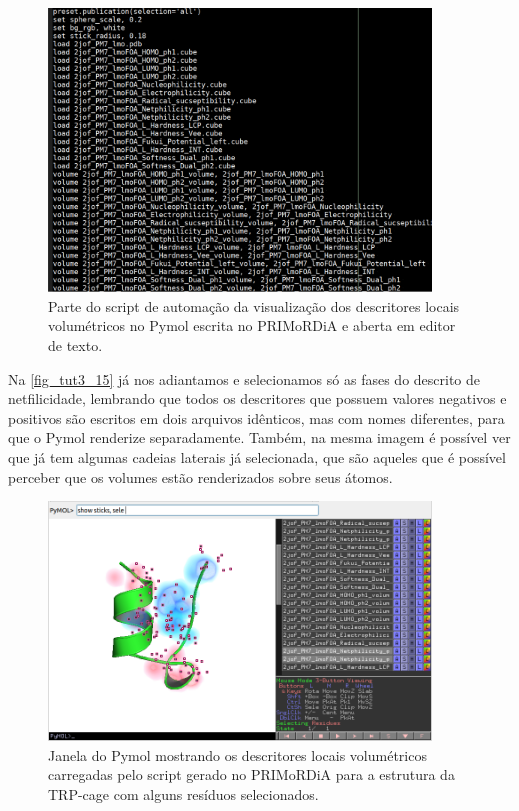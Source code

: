 \documentclass[a4paper,11pt]{refart}
\begin{document}
\hspace*{-\leftmarginwidth}
\begin{minipage}{\fullwidth}
	\begin{figure}[H]
		\begin{center}
			\includegraphics[width=4in]{images/tut3_img15}
			\caption{Parte do script de automação da visualização dos descritores locais volumétricos no Pymol escrita no PRIMoRDiA e aberta em editor de texto.}
			\label{fig_tut3_13}
		\end{center}
	\end{figure}
\end{minipage}


Na \autoref{fig_tut3_15} já nos adiantamos e selecionamos só as fases do descrito de netfilicidade, lembrando que todos os descritores que possuem valores negativos e positivos são escritos em dois arquivos idênticos, mas com nomes diferentes, para que o Pymol renderize separadamente. Também, na mesma imagem é possível ver que já tem algumas cadeias laterais já selecionada, que são aqueles que é possível perceber que os volumes estão renderizados sobre seus átomos. 

\hspace*{-\leftmarginwidth}
\begin{minipage}{\fullwidth}
	\begin{figure}[H]
		\begin{center}
			\includegraphics[width=4in]{images/tut3_img17}
			\caption{Janela do Pymol mostrando os descritores locais volumétricos carregadas pelo script gerado no PRIMoRDiA para a estrutura da TRP-cage com alguns resíduos selecionados.}
			\label{fig_tut3_15}
		\end{center}
	\end{figure}
\end{minipage}
\end{document}

